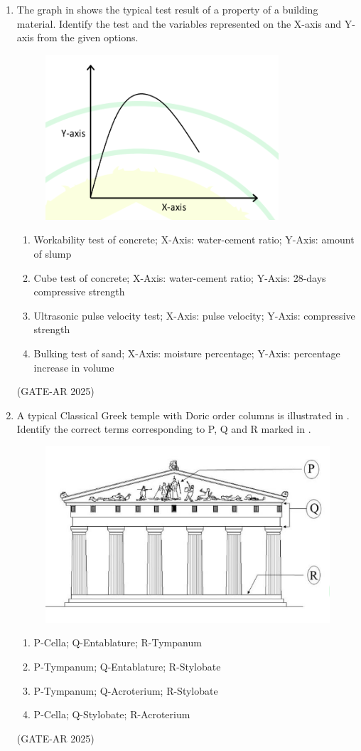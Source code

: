 \documentclass[a4paper,10pt]{article}
\begin{document}
\begin{enumerate}
\newpage

    \item The graph in  shows the typical test result of a property of a building material. Identify the test and the variables represented on the X-axis and Y-axis from the given options.
\begin{figure}[h!]
\centering
\includegraphics[width=0.5\columnwidth]{figs/10.jpg}
\caption{}
\label{fig:Img10}
\end{figure}
\begin{enumerate}
    \item Workability test of concrete; X-Axis: water-cement ratio; Y-Axis: amount of slump
    \item Cube test of concrete; X-Axis: water-cement ratio; Y-Axis: 28-days compressive strength
    \item Ultrasonic pulse velocity test; X-Axis: pulse velocity; Y-Axis: compressive strength
    \item Bulking test of sand; X-Axis: moisture percentage; Y-Axis: percentage increase in volume
\end{enumerate}
\hfill (GATE-AR 2025)

\item A typical Classical Greek temple with Doric order columns is illustrated in . Identify the correct terms corresponding to P, Q and R marked in .
\begin{figure}[h!]
\centering
\includegraphics[width=0.5\columnwidth]{figs/11.jpg}
\caption{}
\label{fig:Img11}
\end{figure}
\begin{enumerate}
    \item P-Cella; Q-Entablature; R-Tympanum
    \item P-Tympanum; Q-Entablature; R-Stylobate
    \item P-Tympanum; Q-Acroterium; R-Stylobate
    \item P-Cella; Q-Stylobate; R-Acroterium
\end{enumerate}
\hfill (GATE-AR 2025)


\end{enumerate}
\end{document}
